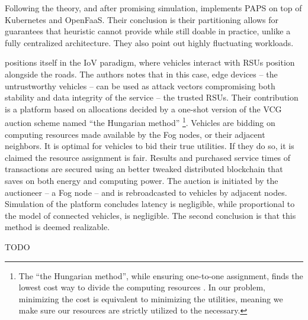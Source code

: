 \documentclass[11pt]{sdm}
\begin{document}
\begin{description}
	Following the theory, and after promising simulation, \citet{baresi_paps_2021} implements \gls{PAPS} on top of Kubernetes and OpenFaaS. Their conclusion is their partitioning allows for guarantees that heuristic cannot provide while still doable in practice, unlike a fully centralized architecture. They also point out highly fluctuating workloads.
	
	\item[\citet{lee_trustful_2020}] positions itself in the \gls{IoV} paradigm, where vehicles interact with \glspl{RSU} position alongside the roads. The authors notes that in this case, edge devices -- the untrustworthy vehicles -- can be used as attack vectors compromising both stability and data integrity of the service -- the trusted \glspl{RSU}. Their contribution is a platform based on allocations decided by a one-shot version of the \gls{VCG} auction scheme named ``the Hungarian method'' \footnote{The ``the Hungarian method'', while ensuring one-to-one assignment, finds the lowest cost way to divide the computing resources \cite{wikipedia_hungarian_2021}. In our problem, minimizing the cost is equivalent to minimizing the utilities, meaning we make sure our resources are strictly utilized to the necessary.}. Vehicles are bidding on computing resources made available by the Fog nodes, or their adjacent neighbors. It is optimal for vehicles to bid their true utilities. If they do so, it is claimed the resource assignment is fair. Results and purchased service times of transactions are secured using an better tweaked distributed blockchain that saves on both energy and computing power. The auction is initiated by the auctioneer -- a Fog node -- and is rebroadcasted to vehicles by adjacent nodes. Simulation of the platform concludes latency is negligible, while proportional to the model of connected vehicles, is negligible. The second conclusion is that this method is deemed realizable.
	
	\item[\citet{cicconetti_decentralized_2021}] TODO
\end{description}




\end{document}
